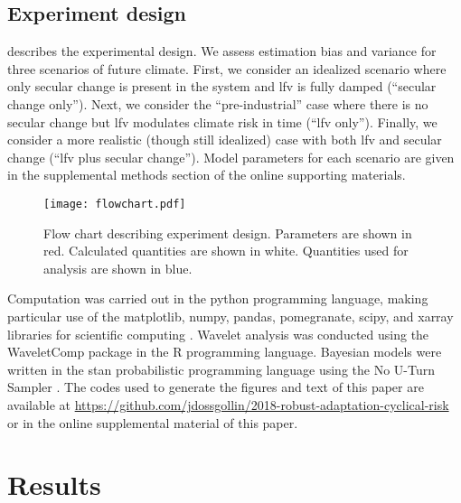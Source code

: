 \documentclass[
  draft,
  linenumbers
]{agujournal2019}
\begin{document}
\subsection{Experiment design}\label{sec:methods-computation}

 describes the experimental design.
We assess estimation bias and variance for three scenarios of future climate.
First, we consider an idealized scenario where only secular change is present in the system and \gls{lfv} is fully damped (``secular change only'').
Next, we consider the ``pre-industrial'' case where there is no secular change but \gls{lfv} modulates climate risk in time (``\acrlong{lfv} only'').
Finally, we consider a more realistic (though still idealized) case with both \gls{lfv} and secular change (``\acrlong{lfv} plus secular change'').
Model parameters for each scenario are given in the supplemental methods section of the online supporting materials.

\begin{figure}
  \texttt{[image: flowchart.pdf]}
  \caption{
    Flow chart describing experiment design.
    Parameters are shown in red.
    Calculated quantities are shown in white.
    Quantities used for analysis are shown in blue.
  }\label{fig:flowchart}
\end{figure}

Computation was carried out in the python programming language, making particular use of the matplotlib, numpy, pandas, pomegranate, scipy, and xarray libraries for scientific computing \citep{Hunter:2007ih, vanderWalt:2011dp, McKinney:2010un, schreiber:2017, Jones:2001uv, Hoyer:2017hs}.
Wavelet analysis was conducted using the WaveletComp package \citep{Roesch:wlBQQoIs} in the R programming language.
Bayesian models were written in the stan probabilistic programming language \citep{Carpenter:2017ke} using the No U-Turn Sampler \citep{Hoffman:2011wm,Betancourt:2017vd}.
The codes used to generate the figures and text of this paper are available at \url{https://github.com/jdossgollin/2018-robust-adaptation-cyclical-risk} or in the online supplemental material of this paper.


\section{Results}\label{sec:results}
\end{document}
